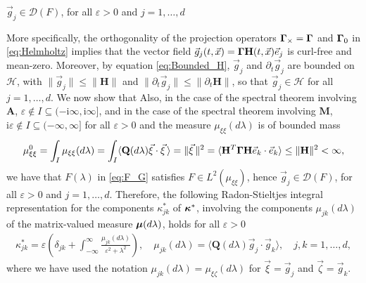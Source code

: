 \documentclass[11pt]{amsart}
\newcommand{\I}{\mathrm{i}}
\newcommand{\Mb}{\mathbf{M}}
\newcommand{\Hb}{\mathbf{H}}
\newcommand{\Ab}{\mathbf{A}}
\newcommand{\Qb}{\mathbf{Q}}
\newcommand{\Hs}{\mathscr{H}}
\newcommand\bmu{\mbox{\boldmath${\mu}$}}
\newcommand\bkappa{\mbox{\boldmath${\kappa}$}}
\newcommand\bGamma{\mbox{\boldmath${\Gamma}$}}
\begin{document}
$\vec{g}_j\in\mathscr{D}(F)$, for all $\varepsilon>0$ and $j=1,\ldots,d$


More specifically, the orthogonality of the projection operators
$\bGamma_\times=\bGamma$ and $\bGamma_0$ in \eqref{eq:Helmholtz} implies
that the vector field
$\vec{g}_j(t,\vec{x})=\bGamma\Hb(t,\vec{x})\vec{e}_j$ is curl-free and
mean-zero. Moreover, by equation \eqref{eq:Bounded_H}, $\vec{g}_j$
and $\partial_t\vec{g}_j$ are bounded on $\Hs$, with $\|\vec{g}_j\|\leq\|\Hb\|$ and
$\|\partial_t\vec{g}_j\|\leq\|\partial_t\Hb\|$, so that $\vec{g}_j\in\Hs$ for all
$j=1,\ldots,d$. We now show that Also, in the case of the spectral theorem involving $\Ab$,
$\varepsilon\not\in I\subseteq(-\I\infty,\I\infty]$, and in the case of the spectral theorem
involving $\Mb$, $\I\varepsilon\not\in I\subseteq(-\infty,\infty]$ for all $\varepsilon>0$ and the measure
$\mu_{\xi\xi}(d\lambda)$ is of bounded mass \cite{Stone:64}  
%
\begin{align}\label{eq:Mass}
  \mu^0_{\xi\xi}=\int_I\mu_{\xi\xi}(d\lambda)
        =\int_I\langle\Qb(d\lambda)\vec{\xi}\cdot\vec{\xi}\,\rangle   
       =\|\vec{\xi}\,\|^2
       =\langle\Hb^T\bGamma\Hb\vec{e}_k\cdot\vec{e}_k\rangle
       \leq\|\Hb\|^2<\infty,
\end{align}
%
we have that $F(\lambda)$ in \eqref{eq:F_G} satisfies $F\in L^2(\mu_{\xi\xi})$, hence 
$\vec{g}_j\in\mathscr{D}(F)$, for all $\varepsilon>0$ and $j=1,\ldots,d$. Therefore, the 
following Radon-Stieltjes integral representation for the components
$\kappa^*_{jk}$ of $\bkappa^*$, involving the components $\mu_{jk}(d\lambda)$ of
the matrix-valued measure $\bmu(d\lambda)$, holds for all $\varepsilon>0$
%
\begin{align}\label{eq:Integral_Rep_kappa*}
  \kappa^*_{jk}=\varepsilon\left(\delta_{jk}+\int_{-\infty}^\infty\frac{\mu_{jk}(d\lambda)}{\varepsilon^2+\lambda^2}\right), \quad
         \mu_{jk}(d\lambda)=\langle\Qb(d\lambda)\vec{g}_j\cdot\vec{g}_k\rangle,
  \quad  j,k=1,\ldots,d,
\end{align}
%
where we have used the notation $\mu_{jk}(d\lambda)=\mu_{\xi\zeta}(d\lambda)$ for
$\vec{\xi}=\vec{g}_j$ and $\vec{\zeta}=\vec{g}_k$.
\end{document}
